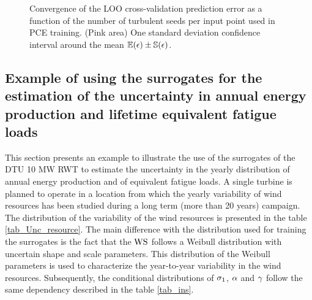 \documentclass[preprint,12pt]{elsarticle}
\begin{document}
\begin{figure}[h!]
\begin{centering}
\caption{Convergence of the LOO cross-validation prediction error as a function of the number of turbulent seeds per input point used in PCE training. (Pink area) One standard deviation confidence interval around the mean $\mathbb{E}(\epsilon) \pm \mathbb{S}(\epsilon)$.}
\label{fig_convergence}
\end{centering}
\end{figure}


\subsection{Example of using the surrogates for the estimation of the  uncertainty in annual energy production and lifetime equivalent fatigue loads}
\label{subsec_Final_EX}

This section presents an example to illustrate the use of the surrogates of the DTU 10 MW RWT to estimate the uncertainty in the yearly distribution of annual energy production and of equivalent fatigue loads. A single turbine is planned to operate in a location from which the yearly variability of wind resources has been studied during a long term (more than 20 years) campaign. The distribution of the variability of the wind resources is presented in the table \ref{tab_Unc_resource}. The main difference with the distribution used for training the surrogates is the fact that the $\text{WS}$ follows a Weibull distribution with uncertain shape and scale parameters. This distribution of the Weibull parameters is used to characterize the year-to-year variability in the wind resources. Subsequently, the conditional distributions of $\sigma_{1}$, $\alpha$ and $\gamma$ follow the same dependency described in the table \ref{tab_ins}.
\end{document}
